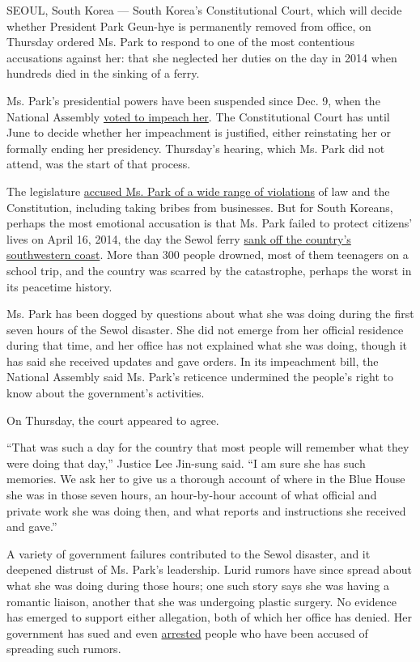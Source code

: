 SEOUL, South Korea --- South Korea's Constitutional Court, which will
decide whether President Park Geun-hye is permanently removed from
office, on Thursday ordered Ms. Park to respond to one of the most
contentious accusations against her: that she neglected her duties on
the day in 2014 when hundreds died in the sinking of a ferry.

Ms. Park's presidential powers have been suspended since Dec. 9, when
the National Assembly
\href{http://www.nytimes.com/2016/12/09/world/asia/south-korea-president-park-geun-hye-impeached.html}{voted
to impeach her}. The Constitutional Court has until June to decide
whether her impeachment is justified, either reinstating her or formally
ending her presidency. Thursday's hearing, which Ms. Park did not
attend, was the start of that process.

The legislature
\href{http://www.nytimes.com/2016/12/08/world/asia/south-korea-park-geun-hye-accusations-impeachment.html}{accused
Ms. Park of a wide range of violations} of law and the Constitution,
including taking bribes from businesses. But for South Koreans, perhaps
the most emotional accusation is that Ms. Park failed to protect
citizens' lives on April 16, 2014, the day the Sewol ferry
\href{https://www.nytimes.com/2014/04/21/world/asia/chaos-ruled-sinking-ferry.html}{sank
off the country's southwestern coast}. More than 300 people drowned,
most of them teenagers on a school trip, and the country was scarred by
the catastrophe, perhaps the worst in its peacetime history.

Ms. Park has been dogged by questions about what she was doing during
the first seven hours of the Sewol disaster. She did not emerge from her
official residence during that time, and her office has not explained
what she was doing, though it has said she received updates and gave
orders. In its impeachment bill, the National Assembly said Ms. Park's
reticence undermined the people's right to know about the government's
activities.

On Thursday, the court appeared to agree.

``That was such a day for the country that most people will remember
what they were doing that day,'' Justice Lee Jin-sung said. ``I am sure
she has such memories. We ask her to give us a thorough account of where
in the Blue House she was in those seven hours, an hour-by-hour account
of what official and private work she was doing then, and what reports
and instructions she received and gave.''

A variety of government failures contributed to the Sewol disaster, and
it deepened distrust of Ms. Park's leadership. Lurid rumors have since
spread about what she was doing during those hours; one such story says
she was having a romantic liaison, another that she was undergoing
plastic surgery. No evidence has emerged to support either allegation,
both of which her office has denied. Her government has sued and even
\href{https://www.nytimes.com/2014/10/10/world/asia/japan-protests-an-indictment-of-a-journalist-.html}{arrested}
people who have been accused of spreading such rumors.

